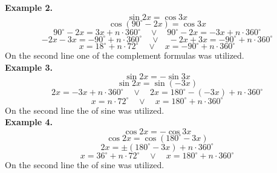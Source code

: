 \documentclass[12pt]{article}
\theoremstyle{definition}
\begin{document}
\textbf{Example 2.} $$\sin2x = \cos3x$$
$$\cos(90^\circ-2x) = \cos3x$$
$$90^\circ-2x = 3x+n\cdot360^\circ \quad \lor \quad 90^\circ-2x = -3x+n\cdot360^\circ$$
$$-2x-3x = -90^\circ+n\cdot360^\circ \quad \lor \quad -2x+3x = -90^\circ+n\cdot360^\circ$$
$$x = 18^\circ+n\cdot72^\circ \quad \lor \quad x = -90^\circ+n\cdot360^\circ$$
On the second line one of the complement formulas was utilized.\\

\textbf{Example 3.} $$\sin{2x} = -\sin{3x}$$
$$\sin{2x} = \sin(-3x)$$
$$2x = -3x+n\cdot360^\circ \quad \lor \quad 2x = 180^\circ-(-3x)+n\cdot360^\circ$$
$$x = n\cdot72^\circ \quad \lor \quad x = 180^\circ+n\cdot360^\circ$$
On the second line the  of sine was utilized.\\

\textbf{Example 4.} $$\cos{2x} = -\cos{3x}$$
$$\cos{2x} = \cos(180^\circ-3x)$$
$$2x = \pm(180^\circ-3x)+n\cdot360^\circ$$
$$x = 36^\circ+n\cdot72^\circ \quad \lor \quad x = 180^\circ+n\cdot360^\circ$$
On the second line the  of sine was utilized.

\end{document}
